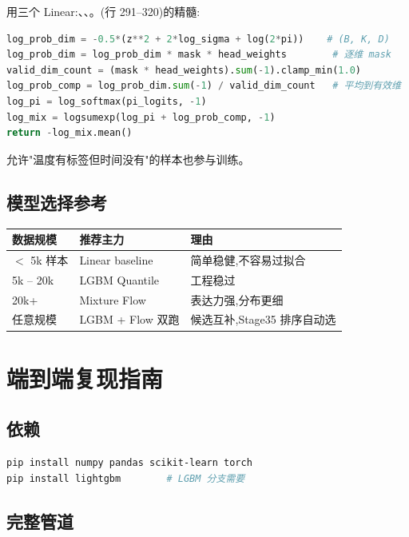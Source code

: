  用三个 Linear:、、。(行 291--320)的精髓:
\begin{lstlisting}[language=Python]
log_prob_dim = -0.5*(z**2 + 2*log_sigma + log(2*pi))    # (B, K, D)
log_prob_dim = log_prob_dim * mask * head_weights        # 逐维 mask
valid_dim_count = (mask * head_weights).sum(-1).clamp_min(1.0)
log_prob_comp = log_prob_dim.sum(-1) / valid_dim_count   # 平均到有效维
log_pi = log_softmax(pi_logits, -1)
log_mix = logsumexp(log_pi + log_prob_comp, -1)
return -log_mix.mean()
\end{lstlisting}

允许"温度有标签但时间没有"的样本也参与训练。

\subsection{模型选择参考}

\begin{center}
\small
\begin{tabular}{lll}
\toprule
数据规模 & 推荐主力 & 理由 \\
\midrule
$<$ 5k 样本 & Linear baseline & 简单稳健,不容易过拟合 \\
5k -- 20k & LGBM Quantile & 工程稳过 \\
20k+ & Mixture Flow & 表达力强,分布更细 \\
任意规模 & LGBM + Flow 双跑 & 候选互补,Stage35 排序自动选 \\
\bottomrule
\end{tabular}
\end{center}

\section{端到端复现指南}

\subsection{依赖}

\begin{lstlisting}[language=bash]
pip install numpy pandas scikit-learn torch
pip install lightgbm        # LGBM 分支需要
\end{lstlisting}

\subsection{完整管道}

